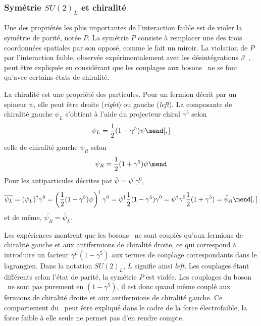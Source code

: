 \subsubsection{Symétrie $SU(2)_L$ et chiralité}\label{chapter-MS-MSSM-section-formalisme-subsec-EW-SU2_L}
Une des propriétés les plus importantes de l'interaction faible est de violer la symétrie de parité, notée $P$.
La symétrie $P$ consiste à remplacer une des trois coordonnées spatiales par son opposé, comme le fait un miroir.
La violation de $P$ par l'interaction faible, observée expérimentalement avec les désintégrations $\beta$~\cite{Wu_P_violation}, peut être expliquée en considérant que les couplages aux bosons \Wboson\ ne se font qu'avec certains états de chiralité.
\par
La chiralité est une propriété des particules.
Pour un fermion décrit par un spineur $\psi$,
elle peut être droite (\emph{right}) ou gauche (\emph{left}).
La composante de chiralité gauche $\psi_L$ s'obtient à l'aide du projecteur chiral $\gamma^5$ selon
\begin{equation}
\psi_L = \frac{1}{2}(1-\gamma^5)\psi
\mend[,]
\label{eq-projo_L}
\end{equation}
celle de chiralité gauche $\psi_R$ selon
\begin{equation}
\psi_R = \frac{1}{2}(1+\gamma^5)\psi
\mend
\label{eq-projo_R}
\end{equation}
Pour les antiparticules décrites par $\bar{\psi}=\psi^\dagger \gamma^0$,
\begin{equation}
\overline{\psi_L}
= (\psi_L)^\dagger \gamma^0
= \left(\frac{1}{2}(1-\gamma^5)\psi\right)^\dagger\gamma^0
= \psi^\dagger \frac{1}{2} (1-\gamma^5) \gamma^0
= \psi^\dagger \gamma^0 \frac{1}{2} (1+\gamma^5)
= \bar{\psi}_R
\mend[,]
\end{equation}
et de même, $\overline{\psi_R} = \bar{\psi}_L$.
\par
Les expériences montrent que les bosons \Wboson\ ne sont couplés qu'aux fermions de chiralité gauche et aux antifermions de chiralité droite, ce qui correspond à introduire un facteur $\gamma^\mu(1-\gamma^5)$ aux termes de couplage correspondants dans le lagrangien.
Dans la notation $SU(2)_L$, $L$ signifie ainsi \emph{left}.
Les couplages étant différents selon l'état de parité, la symétrie $P$ est violée.
Les couplages du boson \Zboson\ ne sont pas purement en $(1-\gamma^5)$, il est donc quand même couplé aux fermions de chiralité droite et aux antifermions de chiralité gauche.
Ce comportement du \Zboson\ peut être expliqué dans le cadre de la force électrofaible, la force faible à elle seule ne permet pas d'en rendre compte.
